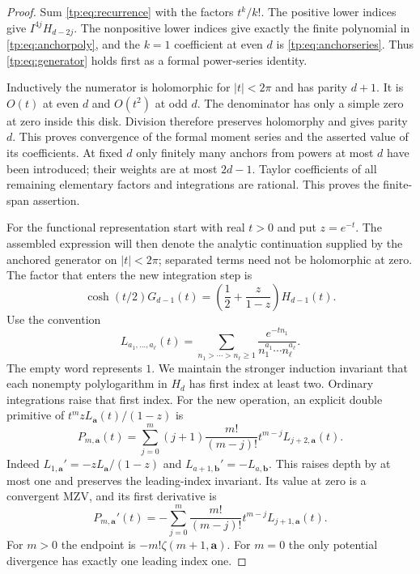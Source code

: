 \begin{proof}
Sum \eqref{tp:eq:recurrence} with the factors $t^k/k!$.  The positive
lower indices give $I^{4j}H_{d-2j}$.  The nonpositive lower indices
give exactly the finite polynomial in \eqref{tp:eq:anchorpoly}, and
the $k=1$ coefficient at even $d$ is \eqref{tp:eq:anchorseries}.  Thus
\eqref{tp:eq:generator} holds first as a formal power-series identity.

Inductively the numerator is holomorphic for $|t|<2\pi$ and has
parity $d+1$.  It is $O(t)$ at even $d$ and $O(t^2)$ at odd $d$.
The denominator has only a simple zero at zero inside this disk.
Division therefore preserves holomorphy and gives parity $d$.
This proves convergence of the formal moment series and the asserted
value of its coefficients.  At fixed $d$ only finitely many anchors
from powers at most $d$ have been introduced; their weights are at
most $2d-1$.  Taylor coefficients of all remaining elementary factors
and integrations are rational.  This proves the finite-span assertion.

For the functional representation start with real $t>0$ and put
$z=e^{-t}$. The assembled expression will then denote the analytic
continuation supplied by the anchored generator on $|t|<2\pi$;
separated terms need not be holomorphic at zero. The factor that
enters the new integration step is
\[
 \cosh(t/2)G_{d-1}(t)
 =\left(\frac12+\frac z{1-z}\right)H_{d-1}(t).
\]
Use the convention
\[
 L_{a_1,\ldots,a_\ell}(t)
 =\sum_{n_1>\cdots>n_\ell\geq1}
       \frac{e^{-tn_1}}{n_1^{a_1}\cdots n_\ell^{a_\ell}}.
\]
The empty word represents $1$. We maintain the stronger induction
invariant that each nonempty polylogarithm in $H_d$ has first index at
least two. Ordinary integrations raise that first index. For the new
operation, an explicit double primitive of
$t^m zL_{\boldsymbol a}(t)/(1-z)$ is
\[
 P_{m,\boldsymbol a}(t)=\sum_{j=0}^m(j+1)\frac{m!}{(m-j)!}
                t^{m-j}L_{j+2,\boldsymbol a}(t).
\]
Indeed $L_{1,\boldsymbol a}'=-zL_{\boldsymbol a}/(1-z)$ and
$L_{a+1,\boldsymbol b}'=-L_{a,\boldsymbol b}$. This raises depth by
at most one and preserves the leading-index invariant. Its value at
zero is a convergent MZV, and its first derivative is
\[
 P_{m,\boldsymbol a}'(t)=-\sum_{j=0}^m\frac{m!}{(m-j)!}
                t^{m-j}L_{j+1,\boldsymbol a}(t).
\]
For $m>0$ the endpoint is $-m!\zeta(m+1,\boldsymbol a)$. For $m=0$
the only potential divergence has exactly one leading index one.


\end{proof}
